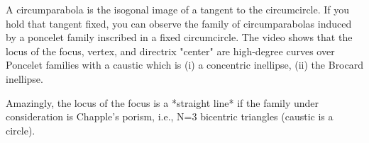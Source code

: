 A circumparabola is the isogonal image of a tangent to the circumcircle. If you hold that tangent fixed, you can observe the family of circumparabolas induced by a poncelet family inscribed in a fixed circumcircle. The video shows that the locus of the focus, vertex, and directrix "center" are high-degree curves over Poncelet families with a caustic which is (i) a concentric inellipse, (ii) the Brocard inellipse.

Amazingly, the locus of the focus is a *straight line* if the family under consideration is Chapple's porism, i.e., N=3 bicentric triangles (caustic is a circle).